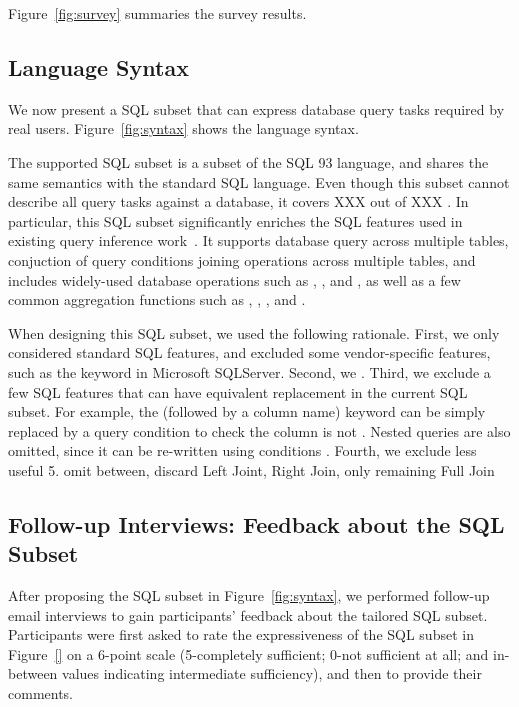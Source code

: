 Figure~\ref{fig:survey} summaries the survey results.

\subsection{Language Syntax}
\label{sec:syntax}

We now present a SQL subset that can express database query
tasks required by real users. Figure~\ref{fig:syntax} shows
the language syntax.


The supported SQL subset is a subset of the SQL 93
language, and shares the same semantics with the standard
SQL language.  Even though this subset cannot describe all query
tasks against a database, it covers XXX out of XXX 
. In particular, this SQL subset significantly
enriches the SQL features used in existing query inference
work~\cite{DasSarma:2010}.  It supports database query
across multiple tables, conjuction of query conditions
joining operations across multiple tables, and includes
widely-used database operations such as ,
, and , as
well as a few common aggregation functions such as , ,
, and .

When designing this SQL subset, we used the following rationale.
First, we only considered standard SQL features, and excluded
some vendor-specific features, such as the  keyword
in Microsoft SQLServer. Second, we . Third, we exclude
a few SQL features that can have equivalent replacement 
in the current SQL subset. For example, the  (followed
by a column name) keyword can be simply replaced by a
query condition to check the column is not .
Nested queries are also omitted, since it can be re-written
using conditions .
Fourth, we exclude less useful
5. omit between, discard Left Joint, Right Join, only remaining Full Join



\subsection{Follow-up Interviews: Feedback about the SQL Subset}
\label{sec:interview}

After proposing the SQL subset in Figure~\ref{fig:syntax},
we performed follow-up email interviews to gain
participants' feedback about the tailored SQL
subset. Participants were first asked to rate
the expressiveness of the SQL subset in Figure~\ref{}
on a 6-point scale (5-completely sufficient; 0-not sufficient at all;
and in-between values indicating intermediate sufficiency),
and then to provide their comments.

